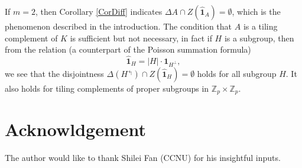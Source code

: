 \documentclass[A4, 11pt]{article}
\newcommand{\G}[1]{\mathbb Z_{#1}\times\mathbb Z_{#1}}
\newcommand{\F}[1]{\widehat{\mathbf 1}_{#1}}
\newcommand{\Z}[1]{Z(\F{#1})}
\begin{document}
If $m=2$, then Corollary \ref{CorDiff} indicates $\Delta A\cap\Z{A}=\emptyset$, which is the phenomenon described in the introduction. The condition that $A$ is a tiling complement of $K$ is sufficient but not necessary, in fact if $H$ is a subgroup, then from the relation (a counterpart of the Poisson summation formula)
$$\F{H}=|H|\cdot \mathbf 1_{H^{\perp}},$$
we see that the disjointness $\Delta(H^{\Lsh})\cap \Z{H}=\emptyset$ holds for all subgroup $H$. It also holds for tiling complements of proper subgroups in $\G{p}$.

\section*{Acknowldgement}
The author would like to thank Shilei Fan (CCNU) for his insightful inputs.
\end{document}
